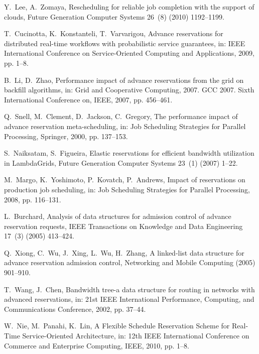 \documentclass[preprint,12pt]{elsarticle}
\begin{document}
\begin{thebibliography}{10}
Y.~Lee, A.~Zomaya, {Rescheduling for reliable job completion with the support
  of clouds}, Future Generation Computer Systems 26~(8) (2010) 1192--1199.

T.~Cucinotta, K.~Konstanteli, T.~Varvarigou, {Advance reservations for
  distributed real-time workflows with probabilistic service guarantees}, in:
  IEEE International Conference on Service-Oriented Computing and Applications,
  2009, pp. 1--8.

B.~Li, D.~Zhao, {Performance impact of advance reservations from the grid on
  backfill algorithms}, in: Grid and Cooperative Computing, 2007. GCC 2007.
  Sixth International Conference on, IEEE, 2007, pp. 456--461.

Q.~Snell, M.~Clement, D.~Jackson, C.~Gregory, {The performance impact of
  advance reservation meta-scheduling}, in: Job Scheduling Strategies for
  Parallel Processing, Springer, 2000, pp. 137--153.

S.~Naiksatam, S.~Figueira, {Elastic reservations for efficient bandwidth
  utilization in LambdaGrids}, Future Generation Computer Systems 23~(1) (2007)
  1--22.

M.~Margo, K.~Yoshimoto, P.~Kovatch, P.~Andrews, {Impact of reservations on
  production job scheduling}, in: Job Scheduling Strategies for Parallel
  Processing, 2008, pp. 116--131.

L.~Burchard, Analysis of data structures for admission control of advance
  reservation requests, IEEE Transactions on Knowledge and Data Engineering
  17~(3) (2005) 413--424.

Q.~Xiong, C.~Wu, J.~Xing, L.~Wu, H.~Zhang, A linked-list data structure for
  advance reservation admission control, Networking and Mobile Computing (2005)
  901--910.

T.~Wang, J.~Chen, Bandwidth tree-a data structure for routing in networks with
  advanced reservations, in: 21st IEEE International Performance, Computing,
  and Communications Conference, 2002, pp. 37--44.

W.~Nie, M.~Panahi, K.~Lin, {A Flexible Schedule Reservation Scheme for
  Real-Time Service-Oriented Architecture}, in: 12th IEEE International
  Conference on Commerce and Enterprise Computing, IEEE, 2010, pp. 1--8.


\end{thebibliography}
\end{document}
